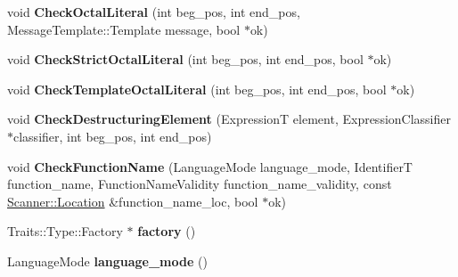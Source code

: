 \begin{DoxyCompactItemize}
\item 
void {\bfseries Check\+Octal\+Literal} (int beg\+\_\+pos, int end\+\_\+pos, Message\+Template\+::\+Template message, bool $\ast$ok)\hypertarget{classv8_1_1internal_1_1_parser_base_a24fc493e628b610854bfdfe7874ce332}{}\label{classv8_1_1internal_1_1_parser_base_a24fc493e628b610854bfdfe7874ce332}

\item 
void {\bfseries Check\+Strict\+Octal\+Literal} (int beg\+\_\+pos, int end\+\_\+pos, bool $\ast$ok)\hypertarget{classv8_1_1internal_1_1_parser_base_a8d13fa5f2f9a8e60c280e2cfbc76839a}{}\label{classv8_1_1internal_1_1_parser_base_a8d13fa5f2f9a8e60c280e2cfbc76839a}

\item 
void {\bfseries Check\+Template\+Octal\+Literal} (int beg\+\_\+pos, int end\+\_\+pos, bool $\ast$ok)\hypertarget{classv8_1_1internal_1_1_parser_base_adbbe79a24a3ea258b00342b3a4113594}{}\label{classv8_1_1internal_1_1_parser_base_adbbe79a24a3ea258b00342b3a4113594}

\item 
void {\bfseries Check\+Destructuring\+Element} (ExpressionT element, Expression\+Classifier $\ast$classifier, int beg\+\_\+pos, int end\+\_\+pos)\hypertarget{classv8_1_1internal_1_1_parser_base_adb63b15b07feeec2386269c889c696ad}{}\label{classv8_1_1internal_1_1_parser_base_adb63b15b07feeec2386269c889c696ad}

\item 
void {\bfseries Check\+Function\+Name} (Language\+Mode language\+\_\+mode, IdentifierT function\+\_\+name, Function\+Name\+Validity function\+\_\+name\+\_\+validity, const \hyperlink{structv8_1_1internal_1_1_scanner_1_1_location}{Scanner\+::\+Location} \&function\+\_\+name\+\_\+loc, bool $\ast$ok)\hypertarget{classv8_1_1internal_1_1_parser_base_a5642d5cd39d07d035440618ed98e265e}{}\label{classv8_1_1internal_1_1_parser_base_a5642d5cd39d07d035440618ed98e265e}

\item 
Traits\+::\+Type\+::\+Factory $\ast$ {\bfseries factory} ()\hypertarget{classv8_1_1internal_1_1_parser_base_aed0e257a9f8d8ca970505812aefb1b07}{}\label{classv8_1_1internal_1_1_parser_base_aed0e257a9f8d8ca970505812aefb1b07}

\item 
Language\+Mode {\bfseries language\+\_\+mode} ()\hypertarget{classv8_1_1internal_1_1_parser_base_a80c52c012dfb52b9bfdbd40695e32717}{}\label{classv8_1_1internal_1_1_parser_base_a80c52c012dfb52b9bfdbd40695e32717}


\end{DoxyCompactItemize}
